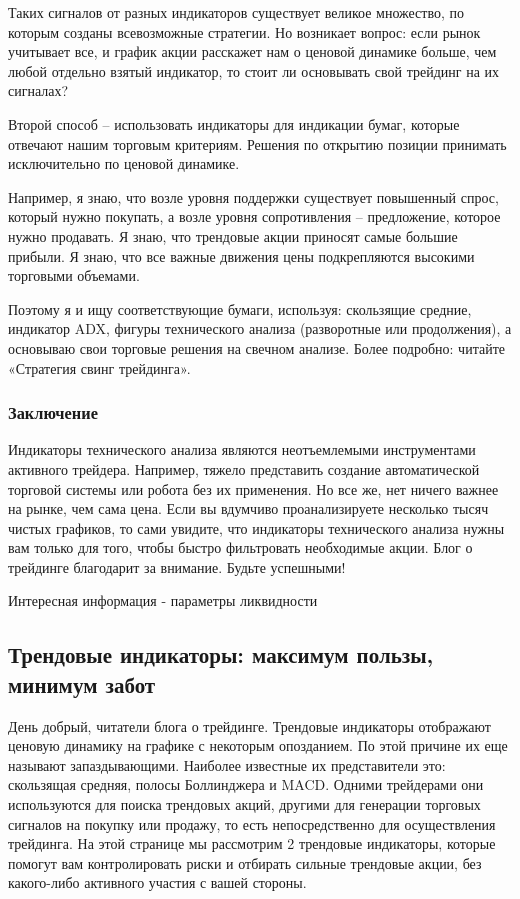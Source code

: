 \documentclass[a5paper]{article}
\begin{document}
Таких сигналов от разных индикаторов существует великое множество, по которым созданы всевозможные стратегии. Но возникает вопрос: если рынок учитывает все, и график акции расскажет нам о ценовой динамике больше, чем любой отдельно взятый индикатор, то стоит ли основывать свой трейдинг на их сигналах?

Второй способ – использовать индикаторы для индикации бумаг, которые отвечают нашим торговым критериям. Решения по открытию позиции принимать исключительно по ценовой динамике.

Например, я знаю, что возле уровня поддержки существует повышенный спрос, который нужно покупать, а возле уровня сопротивления – предложение, которое нужно продавать. Я знаю, что трендовые акции приносят самые большие прибыли. Я знаю, что все важные движения цены подкрепляются высокими торговыми объемами.

Поэтому я и ищу соответствующие бумаги, используя: скользящие средние,
индикатор ADX, фигуры технического анализа (разворотные или
продолжения), а основываю свои торговые решения на свечном
анализе. Более подробно: читайте «Стратегия свинг трейдинга».

\subsubsection{Заключение}

Индикаторы технического анализа являются неотъемлемыми инструментами активного трейдера. Например, тяжело представить создание автоматической торговой системы или робота без их применения. Но все же, нет ничего важнее на рынке, чем сама цена. Если вы вдумчиво проанализируете несколько тысяч чистых графиков, то сами увидите, что индикаторы технического анализа нужны вам только для того, чтобы быстро фильтровать необходимые акции. Блог о трейдинге благодарит за внимание. Будьте успешными!


Интересная информация - параметры ликвидности

\subsection{Трендовые индикаторы: максимум пользы, минимум забот}

День добрый, читатели блога о трейдинге. Трендовые индикаторы отображают ценовую динамику на графике с некоторым опозданием. По этой причине их еще называют запаздывающими. Наиболее известные их представители это: скользящая средняя, полосы Боллинджера и MACD. Одними трейдерами они используются для поиска трендовых акций, другими для генерации торговых сигналов на покупку или продажу, то есть непосредственно для осуществления трейдинга. На этой странице мы рассмотрим 2 трендовые индикаторы, которые помогут вам контролировать риски и отбирать сильные трендовые акции, без какого-либо активного участия с вашей стороны.
\end{document}
